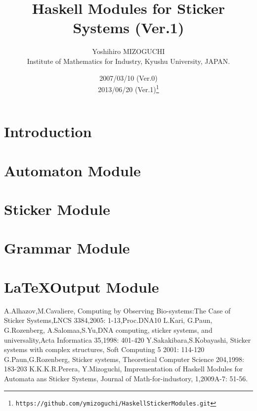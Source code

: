 \documentclass{article}
\begin{document}
\title{Haskell Modules for Sticker Systems (Ver.1)}

\author{Yoshihiro MIZOGUCHI\\
Institute of Mathematics for Industry, Kyushu University, JAPAN.}
\date{2007/03/10 (Ver.0)\\ 2013/06/20 (Ver.1)\footnote{\tt https://github.com/ymizoguchi/HaskellStickerModules.git}}

\maketitle

\tableofcontents

\section{Introduction}


\section{Automaton Module}



\section{Sticker Module}




\section{Grammar Module}




\section{\LaTeX Output Module}




\begin{thebibliography}{99}
A.Alhazov,M.Cavaliere, Computing by Observing Bio-systems:The Case of Sticker Systems,LNCS 3384,2005: 1-13,Proc.DNA10
L.Kari, G.Paun, G.Rozenberg, A.Salomaa,S.Yu,DNA computing, sticker systems, and universality,Acta Informatica 35,1998: 401-420
Y.Sakakibara,S.Kobayashi, Sticker systems with complex structures, Soft Computing 5 2001: 114-120
G.Paun,G.Rozenberg, Sticker systems, Theoretical
	Computer Science 204,1998: 183-203
K.K.K.R.Perera, Y.Mizoguchi,
Imprementation of Haskell Modules for Automata ans Sticker Systems,
Journal of Math-for-industory, 1,2009A-7: 51-56.
\end{thebibliography}
\end{document}
